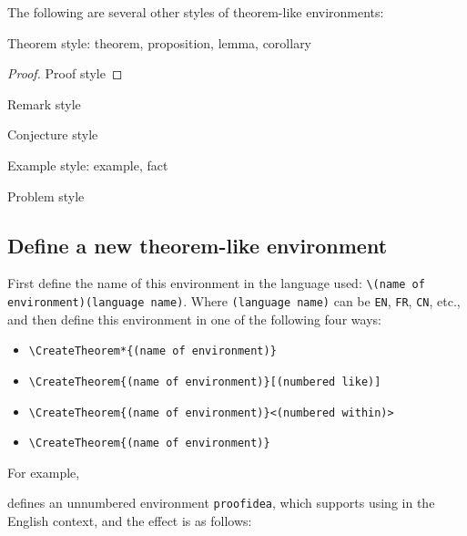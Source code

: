 \documentclass{lebhart}
\begin{document}
\bigskip
The following are several other styles of theorem-like environments:

\begin{theorem}
    Theorem style: theorem, proposition, lemma, corollary
\end{theorem}

\begin{proof}
    Proof style
\end{proof}

\begin{remark}
    Remark style
\end{remark}

\begin{conjecture}
    Conjecture style
\end{conjecture}

\begin{example*}
    Example style: example, fact
\end{example*}

\begin{problem}
    Problem style
\end{problem}

\subsection{Define a new theorem-like environment}

First define the name of this environment in the language used: \lstinline|\(name of environment)(language name)|. Where \lstinline|(language name)| can be \lstinline|EN|, \lstinline|FR|, \lstinline|CN|, etc., and then define this environment in one of the following four ways:
\begin{itemize}
    \item \lstinline|\CreateTheorem*{(name of environment)}|
    \item \lstinline|\CreateTheorem{(name of environment)}[(numbered like)]|
    \item \lstinline|\CreateTheorem{(name of environment)}<(numbered within)>|
    \item \lstinline|\CreateTheorem{(name of environment)}|
\end{itemize}

\def\proofideanameEN{Idea}

For example,
\begin{code}
  \def\proofideanameEN{Idea}
\end{code}
defines an unnumbered environment \lstinline|proofidea|, which supports using in the English context, and the effect is as follows:
\end{document}
